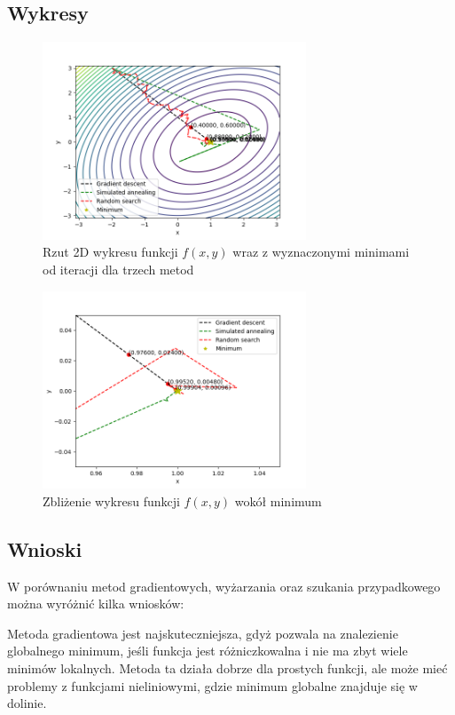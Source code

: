 \documentclass{article}
\begin{document}
\subsection{Wykresy}

\begin{figure}[H]
    \centering
    \includegraphics[width=0.7\textwidth]{Zad3/plot.png}
    \caption{Rzut 2D wykresu funkcji $f(x, y)$ wraz z 
    wyznaczonymi minimami od iteracji dla trzech metod}
\end{figure}

\begin{figure}[H]
    \centering
    \includegraphics[width=0.7\textwidth]{Zad3/plot_zoomed.png}
    \caption{Zbliżenie wykresu funkcji $f(x, y)$ wokół minimum}
\end{figure}

\subsection{Wnioski}
W porównaniu metod gradientowych, wyżarzania oraz szukania 
przypadkowego można wyróżnić kilka wniosków:

Metoda gradientowa jest najskuteczniejsza, gdyż pozwala na znalezienie 
globalnego minimum, jeśli funkcja jest różniczkowalna i nie ma zbyt 
wiele minimów lokalnych. Metoda ta działa dobrze dla prostych funkcji, 
ale może mieć problemy z funkcjami nieliniowymi, 
gdzie minimum globalne znajduje się w dolinie.
\end{document}
